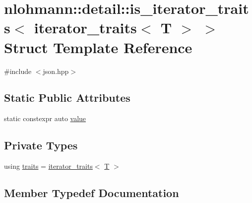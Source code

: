 \hypertarget{structnlohmann_1_1detail_1_1is__iterator__traits_3_01iterator__traits_3_01_t_01_4_01_4}{}\section{nlohmann\+::detail\+::is\+\_\+iterator\+\_\+traits$<$ iterator\+\_\+traits$<$ T $>$ $>$ Struct Template Reference}
\label{structnlohmann_1_1detail_1_1is__iterator__traits_3_01iterator__traits_3_01_t_01_4_01_4}


{\ttfamily \#include $<$json.\+hpp$>$}

\subsection*{Static Public Attributes}
\begin{DoxyCompactItemize}
\item 
static constexpr auto \mbox{\hyperlink{structnlohmann_1_1detail_1_1is__iterator__traits_3_01iterator__traits_3_01_t_01_4_01_4_ac2711760b352b8921accc6609957dc90}{value}}
\end{DoxyCompactItemize}
\subsection*{Private Types}
\begin{DoxyCompactItemize}
\item 
using \mbox{\hyperlink{structnlohmann_1_1detail_1_1is__iterator__traits_3_01iterator__traits_3_01_t_01_4_01_4_a1cbceaaa83a3ad294c3cb66b9df48e78}{traits}} = \mbox{\hyperlink{structnlohmann_1_1detail_1_1iterator__traits}{iterator\+\_\+traits}}$<$ \mbox{\hyperlink{_keyboard_event_8h_adf1f3edb9115acb0a1e04209b7a9937b}{T}} $>$
\end{DoxyCompactItemize}


\subsection{Member Typedef Documentation}
\mbox{\label{structnlohmann_1_1detail_1_1is__iterator__traits_3_01iterator__traits_3_01_t_01_4_01_4_a1cbceaaa83a3ad294c3cb66b9df48e78}} 
